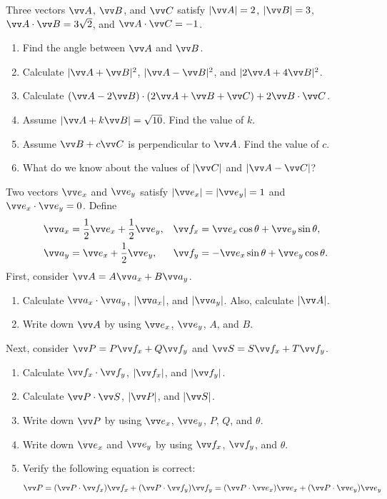 \documentclass[11pt,pdfa,lastpage]{MishoNote}
\begin{document}
\begin{problems}
  \Problem[B] \relax\relax\label{q:cpexpand}%
  Three vectors $\vc A$, $\vc B$, and $\vc C$ satisfy $|\vc A|=2$, $|\vc B|=3$, $\vc A\cdot \vc B=3\sqrt2$, and $\vc A\cdot\vc C=-1$.
  \begin{enumerate}
    \item Find the angle between $\vc A$ and $\vc B$.
    \item Calculate $|\vc A+\vc B|^2$, $|\vc A-\vc B|^2$, and $|2\vc A+4\vc B|^2$.
    \item Calculate $(\vc A-2\vc B)\cdot(2\vc A+\vc B+\vc C)+2\vc B\cdot\vc C$.
    \item Assume $|\vc A+k\vc B|=\sqrt{10}$. Find the value of $k$.
    \item Assume $\vc B+c\vc C$ is perpendicular to $\vc A$. Find the value of $c$.
    \item What do we know about the values of $|\vc C|$ and $|\vc A-\vc C|$?
  \end{enumerate}
  \Problem[C] \relax\label{q:vecbasisrot}
  Two vectors $\vvex$ and $\vvey$ satisfy  $|\vvex|=|\vvey|=1$ and $\vvex\cdot\vvey=0$. Define
\begin{align*}
  \vc{a_x}&=\frac12\vvex+\frac12\vvey,&
  \vc{f_x}&=\vvex\cos\theta+\vvey\sin\theta,  \\
  \vc{a_y}&=\vvex+\frac12\vvey,&
  \vc{f_y}&=-\vvex\sin\theta+\vvey\cos\theta.
\end{align*}
First, consider $\vc A=A\vc{a_x}+B\vc{a_y}$.
\begin{enumerate}
  \item Calculate $\vc{a_x}\cdot\vc{a_y}$, $|\vc{a_x}|$, and $|\vc {a_y}|$. Also, calculate $|\vc A|$.
  \item Write down $\vc A$ by using $\vc{e_x}$, $\vc{e_y}$, $A$, and $B$.
\end{enumerate}
Next, consider $\vc P=P\vc{f_x}+Q\vc{f_y}$ and $\vc S=S\vc{f_x}+T\vc{f_y}$.
\begin{enumerate}[resume]
  \item Calculate $\vc{f_x}\cdot\vc{f_y}$, $|\vc{f_x}|$, and $|\vc {f_y}|$.
  \item Calculate $\vc P\cdot\vc S$, $|\vc P|$, and $|\vc S|$.
  \item Write down $\vc P$ by using $\vvex$, $\vvey$, $P$, $Q$, and $\theta$.
  \item Write down $\vvex$ and $\vvey$ by using $\vc{f_x}$, $\vc{f_y}$, and $\theta$.
  \item Verify the following equation is correct:
  \[\vc P=(\vc P\cdot\vc{f_x})\vc{f_x}+(\vc P\cdot\vc{f_y})\vc{f_y}
  =(\vc P\cdot\vc{e_x})\vc{e_x}+(\vc P\cdot\vc{e_y})\vc{e_y}\]
\end{enumerate}
\end{problems}
\end{document}
